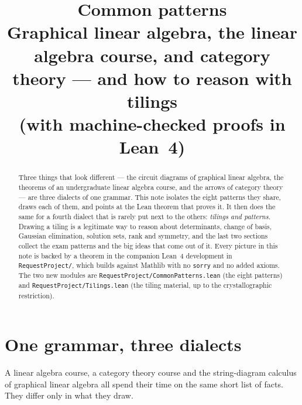 \documentclass[11pt]{article}
\title{\bf Common patterns\\[2mm]
\large Graphical linear algebra, the linear algebra course, and category
theory --- and how to reason with tilings\\ (with machine-checked proofs in Lean~4)}
\author{}
\date{}
\theoremstyle{definition}
\theoremstyle{plain}
\theoremstyle{remark}
\newcommand{\lean}[1]{\texttt{\small #1}}
\newcommand{\file}[1]{\texttt{\small #1}}
\begin{document}
\sloppy
\maketitle

\begin{abstract}
Three things that look different --- the circuit diagrams of graphical linear
algebra, the theorems of an undergraduate linear algebra course, and the arrows
of category theory --- are three dialects of one grammar.  This note isolates
the eight patterns they share, draws each of them, and points at the Lean
theorem that proves it.  It then does the same for a fourth dialect that is
rarely put next to the others: \emph{tilings and patterns}.  Drawing a tiling is
a legitimate way to reason about determinants, change of basis, Gaussian
elimination, solution sets, rank and symmetry, and the last two sections
collect the exam patterns and the big ideas that come out of it.  Every picture
in this note is backed by a theorem in the companion Lean~4 development in
\file{RequestProject/}, which builds against Mathlib with no \lean{sorry} and no
added axioms.  The two new modules are \file{RequestProject/CommonPatterns.lean}
(the eight patterns) and \file{RequestProject/Tilings.lean} (the tiling
material, up to the crystallographic restriction).
\end{abstract}

\tableofcontents

\section{One grammar, three dialects}

A linear algebra course, a category theory course and the string-diagram
calculus of graphical linear algebra all spend their time on the same short list
of facts.  They differ only in what they draw.

\begin{center}
\end{center}
\end{document}
